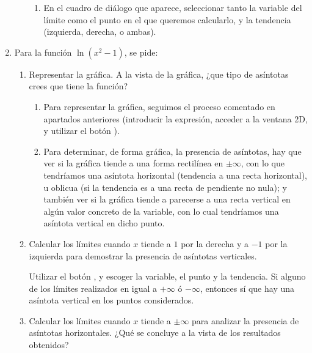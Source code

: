 \begin{enumerate}[leftmargin=*]
\begin{enumerate}
\begin{indicacion}
\begin{enumerate}
\item En el cuadro de diálogo que aparece, seleccionar tanto la variable del límite como el punto en el que queremos calcularlo, y la
tendencia (izquierda, derecha, o ambas).
\end{enumerate}
\end{indicacion}
\end{enumerate}


\item Para la función $\ln(x^2-1)$, se pide: 
\begin{enumerate}
\item Representar la gráfica. A la vista de la gráfica, ¿que tipo de asíntotas crees que tiene la función?
\begin{indicacion}
\begin{enumerate}
\item Para representar la gráfica, seguimos el proceso comentado en apartados anteriores (introducir la expresión, acceder a la ventana 2D,
y utilizar el botón ).
\item Para determinar, de forma gráfica, la presencia de asíntotas, hay que ver si la gráfica tiende a una forma rectilínea en $\pm \infty$,
con lo que tendríamos una asíntota horizontal (tendencia a una recta horizontal), u oblicua (si la tendencia es a una recta de pendiente no
nula); y también ver si la gráfica tiende a parecerse a una recta vertical en algún valor concreto de la variable, con lo cual tendríamos
una asíntota vertical en dicho punto.
\end{enumerate}
\end{indicacion}

\item Calcular los límites cuando $x$ tiende a $1$ por la derecha
y a $-1$ por la izquierda para demostrar la presencia de asíntotas
verticales.

\begin{indicacion}
Utilizar el botón , y escoger la variable, el punto y la tendencia. Si alguno de los límites realizados en igual a
$+\infty$ ó $-\infty$, entonces sí que hay una asíntota vertical en los puntos considerados.
\end{indicacion}

\item Calcular los límites cuando $x$ tiende a $\pm\infty$ para analizar la presencia de asíntotas horizontales. ¿Qué se concluye a la vista
de los resultados obtenidos?


\end{enumerate}
\end{enumerate}
